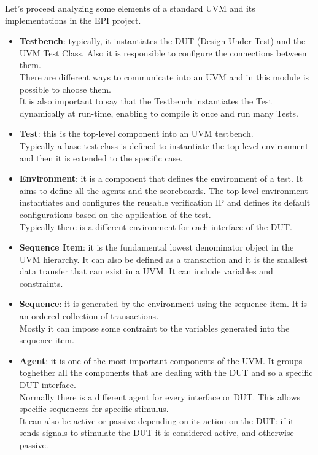 Let's proceed analyzing some elements of a standard UVM and its implementations in the EPI project.

\begin{itemize}
    \item \textbf{Testbench}: typically, it instantiates the DUT (Design Under Test) and the UVM Test Class. Also it is responsible to configure the connections between them.\\
    There are different ways to communicate into an UVM and in this module is possible to choose them.\\
    It is also important to say that the Testbench instantiates the Test dynamically at run-time, enabling to compile it once and run many Tests.
    
    \item \textbf{Test}: this is the top-level component into an UVM testbench.\\
    Typically a base test class is defined to instantiate the top-level environment and then it is extended to the specific case.
    
    \item \textbf{Environment}: it is a component that defines the environment of a test. It aims to define all the agents and the scoreboards. 
    The top-level environment instantiates and configures the reusable verification IP and defines its default configurations based on the application of the test.\\
    
    Typically there is a different environment for each interface of the DUT.
    
    \item \textbf{Sequence Item}: it is the fundamental lowest denominator object in the UVM hierarchy. It can also be defined as a transaction and it is the smallest data transfer that can exist in a UVM. It can include variables and constraints.\\
    
    
    \item \textbf{Sequence}: it is generated by the environment using the sequence item. It is an ordered collection of transactions.\\
    Mostly it can impose some contraint to the variables generated into the sequence item.
    
    \item \textbf{Agent}: it is one of the most important components of the UVM. It groups toghether all the components that are dealing with the DUT and so a specific DUT interface.\\
    Normally there is a different agent for every interface or DUT. This allows specific sequencers for specific stimulus.\\
    It can also be active or passive depending on its action on the DUT: if it sends signals to stimulate the DUT it is considered active, and otherwise passive.
    

\end{itemize}
